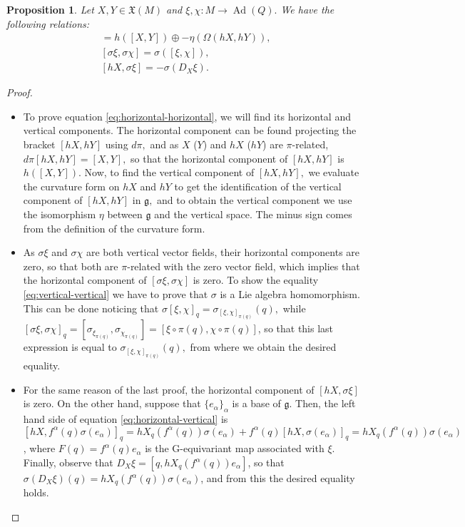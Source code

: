 \documentclass[12pt, letterpaper, reqno]{amsart}
\theoremstyle{definition}
\theoremstyle{plain}
\newtheorem{prop}{Proposition}
\theoremstyle{remark}
\begin{document}
\begin{prop}
	Let $ X,Y\in \mathfrak{X}(M) $ and $ \xi,\chi: M \rightarrow \operatorname{Ad} (Q). $ We have the following relations:
\begin{align}
 [hX, hY] = h([X,Y])\oplus -\eta(\Omega(hX,hY)), \label{eq:horizontal-horizontal}\\
 [\sigma\xi, \sigma\chi] = \sigma([\xi,\chi]), \label{eq:vertical-vertical} \\
 [hX,\sigma \xi] = - \sigma(D_X\xi). \label{eq:horizontal-vertical} 
\end{align}

\end{prop}

\begin{proof}

	\begin{itemize}
		\item To prove equation \eqref{eq:horizontal-horizontal}, we will find its horizontal and vertical components. The horizontal component can be found projecting the bracket $ [hX,hY] $ using $ d\pi, $ and as $ X $ ($ Y $) and $ hX $ ($hY$)   are $ \pi $-related, $ d\pi[hX, hY]=[X,Y], $ so that the horizontal component of $ [hX,hY] $ is $ h([X,Y]) $. Now, to find the vertical component of $ [hX,hY], $ we evaluate the curvature form on $ hX $ and $ hY $ to get the identification of the vertical component of $ [hX,hY] $ in $ \mathfrak{g}, $ and to obtain the vertical component we use the isomorphism $ \eta $ between $ \mathfrak{g} $ and the vertical space. The minus sign comes from the definition of the curvature form.

		\item As $ \sigma \xi $ and $ \sigma\chi $ are both vertical vector fields, their horizontal components are zero, so that both are $ \pi $-related with the zero vector field, which implies that the horizontal component of $ [\sigma\xi, \sigma\chi] $ is zero. To show the equality \eqref{eq:vertical-vertical} we have to prove that $ \sigma $ is a Lie algebra homomorphism. This can be done noticing that $ \sigma[\xi, \chi]_q = \sigma_{[\xi,\chi]_{\pi(q)}}(q), $  while $ [\sigma\xi,\sigma\chi]_q = [\sigma_{\xi_{\pi(q)}}, \sigma_{\chi_{\pi(q)}}] =[\xi\circ\pi(q),\chi\circ\pi(q)] $, so that this last expression is equal to $ \sigma_{[\xi, \chi]_{\pi(q)}}(q), $ from where we obtain the desired equality.

		\item For the same reason of the last proof, the horizontal component of $ [hX,\sigma \xi] $ is zero. On the other hand, suppose that $ \{e_\alpha\}_\alpha $ is a base of $ \mathfrak{g}.  $ Then, the left hand side of equation \eqref{eq:horizontal-vertical} is $[hX, f^\alpha(q) \sigma(e_\alpha)]_q = hX_q (f^\alpha(q))\sigma(e_\alpha) + f^\alpha(q) [hX, \sigma(e_\alpha)]_q = hX_q (f^\alpha(q))\sigma(e_\alpha)$, where $ F(q) = f^\alpha(q)e_\alpha $ is the G-equivariant map associated with $ \xi $. Finally, observe that $D_X\xi= [q,  hX_q (f^\alpha(q))e_\alpha]$, so that $\sigma(D_X\xi)(q) = hX_q (f^\alpha(q))\sigma(e_\alpha) $, and from this the desired equality holds. 
	\end{itemize}
\end{proof}
\end{document}
